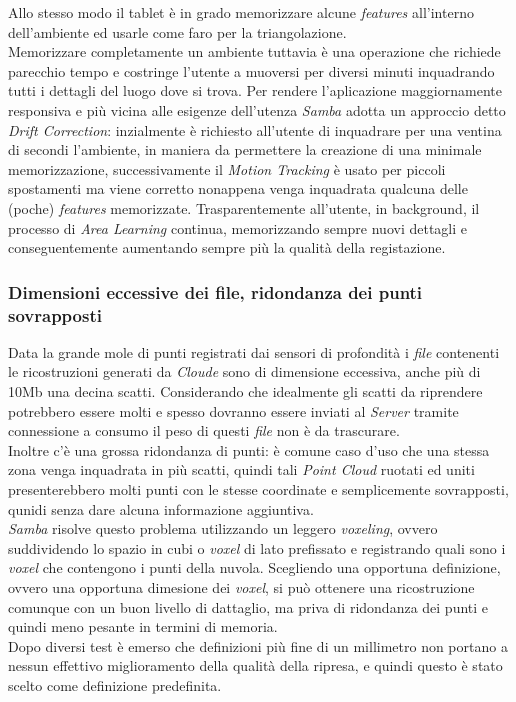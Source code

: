 Allo stesso modo il tablet è in grado memorizzare alcune \emph{features} all'interno dell'ambiente ed usarle come faro per la triangolazione. \\
Memorizzare completamente un ambiente tuttavia è una operazione che richiede parecchio tempo e costringe l'utente a muoversi per diversi minuti inquadrando tutti i dettagli del luogo dove si trova. Per rendere l'aplicazione maggiornamente responsiva e più vicina alle esigenze dell'utenza \emph{Samba} adotta un approccio detto \emph{Drift Correction}: inzialmente è richiesto all'utente di inquadrare per una ventina di secondi l'ambiente, in maniera da permettere la creazione di una minimale memorizzazione, successivamente il \emph{Motion Tracking} è usato per piccoli spostamenti ma viene corretto nonappena venga inquadrata qualcuna delle (poche) \emph{features} memorizzate. Trasparentemente all'utente, in background, il processo di \emph{Area Learning} continua, memorizzando sempre nuovi dettagli e conseguentemente aumentando sempre più la qualità della registazione.\\

\subsubsection{Dimensioni eccessive dei file, ridondanza dei punti sovrapposti}
Data la grande mole di punti registrati dai sensori di profondità i \emph{file} contenenti le ricostruzioni generati da \emph{Cloude} sono di dimensione eccessiva, anche più di 10Mb una decina scatti.
Considerando che idealmente gli scatti da riprendere potrebbero essere molti e spesso dovranno essere inviati al \emph{Server} tramite connessione a consumo il peso di questi \emph{file} non è da trascurare.\\
Inoltre c'è una grossa ridondanza di punti: è comune caso d'uso che una stessa zona venga inquadrata in più scatti, quindi tali \emph{Point Cloud} ruotati ed uniti presenterebbero molti punti con le stesse coordinate e semplicemente sovrapposti, qunidi senza dare alcuna informazione aggiuntiva.\\
\emph{Samba} risolve questo problema utilizzando un leggero \emph{voxeling}, ovvero suddividendo lo spazio in cubi o \emph{voxel} di lato prefissato e registrando quali sono i \emph{voxel} che contengono i punti della nuvola.
Scegliendo una opportuna definizione, ovvero una opportuna dimesione dei \emph{voxel}, si può ottenere una ricostruzione comunque con un buon livello di dattaglio, ma priva di ridondanza dei punti e quindi meno pesante in termini di memoria.\\
Dopo diversi test è emerso che definizioni più fine di un millimetro non portano a nessun effettivo miglioramento della qualità della ripresa, e quindi questo è stato scelto come definizione predefinita.

